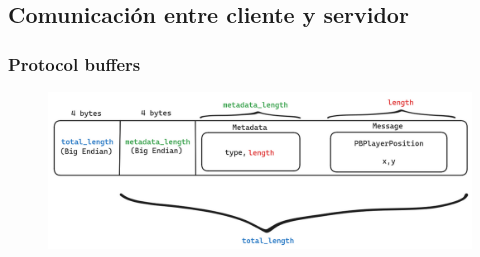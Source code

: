 \subsection{Comunicación entre cliente y servidor}

\subsubsection{Protocol buffers}

\begin{figure}[htbp]
    \centering
    \includegraphics[width=1.0\textwidth]{../assets/protobuf.png}
\end{figure}